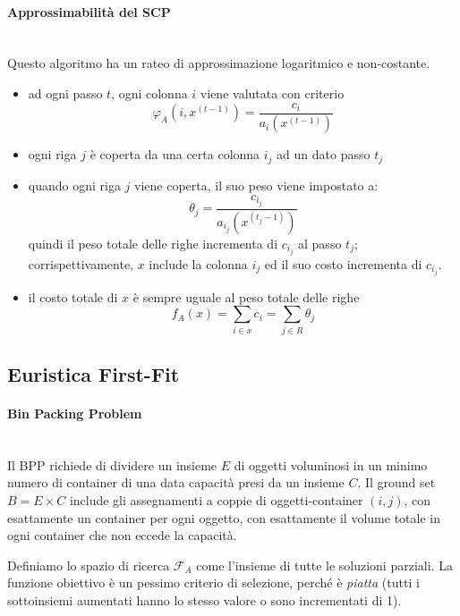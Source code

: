\documentclass{article}
\begin{document}
    \paragraph{Approssimabilità del SCP}\mbox{}\\
    Questo algoritmo ha un rateo di approssimazione logaritmico e non-costante.
    \begin{itemize}
        \item ad ogni passo $t$, ogni colonna $i$ viene valutata con criterio
              $$\varphi_A(i,x^{(t-1)})=\frac{c_i}{a_i(x^{(t-1)})}$$
        \item ogni riga $j$ è coperta da una certa colonna $i_j$ ad un dato passo $t_j$
        \item quando ogni riga $j$ viene coperta, il suo peso viene impostato a:
              $$\theta_j=\frac{c_{i_j}}{a_{i_j}(x^{(t_j-1)})}$$
              quindi il peso totale delle righe incrementa di $c_{i_j}$ al passo $t_j$;
              corrispettivamente, $x$ include la colonna $i_j$ ed il suo costo incrementa
              di $c_{i_j}$.
        \item il costo totale di $x$ è sempre uguale al peso totale delle righe
              $$f_A(x)=\sum_{i\in x}c_i=\sum_{j\in R}\theta_j$$
    \end{itemize}

    \subsection{Euristica First-Fit}
    \paragraph{Bin Packing Problem}\mbox{}\\
    Il BPP richiede di dividere un insieme $E$ di oggetti voluminosi in un minimo
    numero di container di una data capacità presi da un insieme $C$.
    Il ground set $B=E\times C$ include gli assegnamenti a coppie di oggetti-container $(i,j)$,
    con esattamente un container per ogni oggetto, con esattamente il volume totale in ogni container che non
    eccede la capacità.

    Definiamo lo spazio di ricerca $\mathcal{F}_A$ come l'insieme di tutte le soluzioni
    parziali. La funzione obiettivo è un pessimo criterio di selezione, perché è \textit{piatta}
    (tutti i sottoinsiemi aumentati hanno lo stesso valore o sono incrementati di 1).
\end{document}
